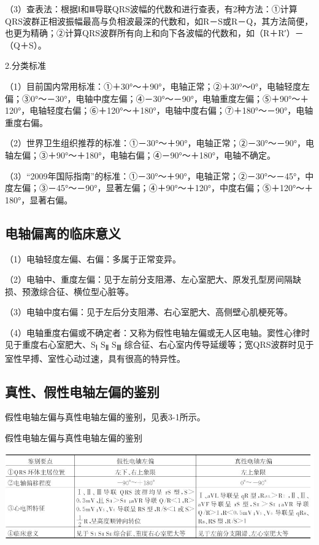（3）查表法：根据Ⅰ和Ⅲ导联QRS波幅的代数和进行查表，有2种方法：①计算QRS波群正相波振幅最高与负相波最深的代数和，如R－S或R－Q，其方法简便，也更为精确；②计算QRS波群所有向上和向下各波幅的代数和，如（R＋R′）－（Q＋S）。

2.分类标准

（1）目前国内常用标准：①＋30°～＋90°，电轴正常；②＋30°～0°，电轴轻度左偏；③0°～－30°，电轴中度左偏；④－30°～－90°，电轴重度左偏；⑤＋90°～＋120°，电轴轻度右偏；⑥＋120°～＋180°，电轴中度右偏；⑦＋180°～－90°，电轴重度右偏。

（2）世界卫生组织推荐的标准：①－30°～＋90°，电轴正常；②－30°～－90°，电轴左偏；③＋90°～＋180°，电轴右偏；④－90°～＋180°，电轴不确定。

（3）“2009年国际指南”的标准：①－30°～＋90°，电轴正常；②－30°～－45°，中度左偏；③－45°～－90°，显著左偏；④＋90°～＋120°，中度右偏；⑤＋120°～＋180°，显著右偏。

\protect\hypertarget{text00009.htmlux5cux23subid49}{}{}

\subsection{电轴偏离的临床意义}

（1）电轴轻度左偏、右偏：多属于正常变异。

（2）电轴中、重度左偏：见于左前分支阻滞、左心室肥大、原发孔型房间隔缺损、预激综合征、横位型心脏等。

（3）电轴中度右偏：见于左后分支阻滞、右心室肥大、高侧壁心肌梗死等。

（4）电轴重度右偏或不确定者：又称为假性电轴左偏或无人区电轴。窦性心律时见于重度右心室肥大、S\textsubscript{Ⅰ}
S\textsubscript{Ⅱ} S\textsubscript{Ⅲ}
综合征、右心室内传导延缓等；宽QRS波群时见于室性早搏、室性心动过速，具有很高的特异性。

\protect\hypertarget{text00009.htmlux5cux23subid50}{}{}

\subsection{真性、假性电轴左偏的鉴别}

假性电轴左偏与真性电轴左偏的鉴别，见表3-1所示。

\begin{table}[htbp]
\centering
\caption{假性电轴左偏与真性电轴左偏的鉴别}
\label{tab3-1}
\includegraphics[width=5.46875in,height=1.51042in]{./images/Image00059.jpg}
\end{table}

